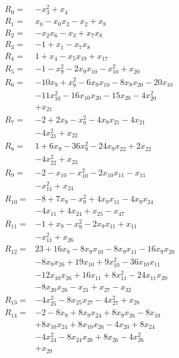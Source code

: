 \allowdisplaybreaks[4]
\begin{align*}
R_{0}={}&-x_{3}^{2} +x_{4}\\[3pt]
R_{1}={}&x_{0} -x_{0}x_{2} -x_{2} +x_{8}\\[3pt]
R_{2}={}&-x_{2}x_{6} -x_{3} +x_{7}x_{8}\\[3pt]
R_{3}={}&-1 +x_{1} -x_{7}x_{8}\\[3pt]
R_{4}={}&1 +x_{4} -x_{5}x_{19} +x_{17}\\[3pt]
R_{5}={}&-1 -x_{9}^{2} -2x_{9}x_{10} -x_{10}^{2} +x_{20}\\[3pt]
R_{6}={}&-10x_{9} +x_{9}^{2} -6x_{9}x_{10} -8x_{9}x_{20} -20x_{10}\\
&-11x_{10}^{2} -16x_{10}x_{20} -15x_{20} -4x_{20}^{2}\\
&+x_{21}\\[3pt]
R_{7}={}&-2 +2x_{9} -x_{9}^{2} -4x_{9}x_{21} -4x_{21}\\
&-4x_{21}^{2} +x_{22}\\[3pt]
R_{8}={}&1 +6x_{9} -36x_{9}^{2} -24x_{9}x_{22} +2x_{22}\\
&-4x_{22}^{2} +x_{23}\\[3pt]
R_{9}={}&-2 -x_{10} -x_{10}^{2} -2x_{10}x_{11} -x_{11}\\
&-x_{11}^{2} +x_{24}\\[3pt]
R_{10}={}&-8 +7x_{9} -x_{9}^{2} +4x_{9}x_{11} -4x_{9}x_{24}\\
&-4x_{11} +4x_{24} +x_{25} -x_{47}\\[3pt]
R_{11}={}&-1 +x_{9} -x_{9}^{2} -2x_{9}x_{11} +x_{11}\\
&-x_{11}^{2} +x_{26}\\[3pt]
R_{12}={}&23 +16x_{9} -8x_{9}x_{10} -8x_{9}x_{11} -16x_{9}x_{20}\\
&-8x_{9}x_{26} +19x_{10} +9x_{10}^{2} -36x_{10}x_{11}\\
&-12x_{10}x_{26} +16x_{11} +8x_{11}^{2} -24x_{11}x_{20}\\
&-8x_{20}x_{26} -x_{21} +x_{27} -x_{32}\\[3pt]
R_{13}={}&-4x_{25}^{2} -8x_{25}x_{27} -4x_{27}^{2} +x_{28}\\[3pt]
R_{14}={}&-2 -8x_{9} +8x_{9}x_{24} +8x_{9}x_{26} -8x_{10}\\
&+8x_{10}x_{24} +8x_{10}x_{26} -4x_{20} +8x_{24}\\
&-4x_{24}^{2} -8x_{24}x_{26} +8x_{26} -4x_{26}^{2}\\
&+x_{29}\\[3pt]

\end{align*}
